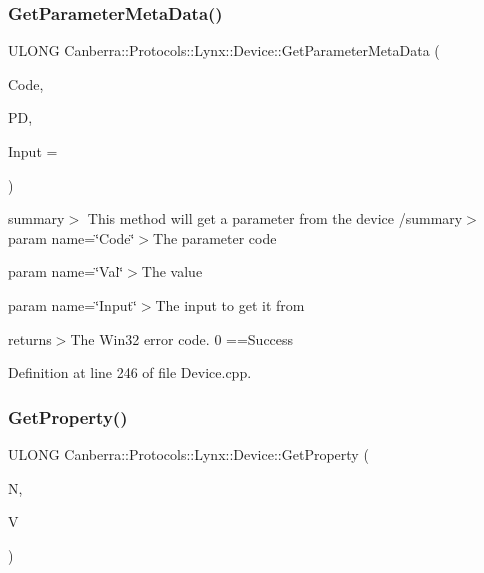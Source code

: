 \subsubsection{\texorpdfstring{Get\+Parameter\+Meta\+Data()}{GetParameterMetaData()}}
{\footnotesize\ttfamily U\+L\+O\+NG Canberra\+::\+Protocols\+::\+Lynx\+::\+Device\+::\+Get\+Parameter\+Meta\+Data (\begin{DoxyParamCaption}\item[{L\+O\+NG}]{Code,  }\item[{\hyperlink{class_canberra_1_1_data_types_1_1_application_1_1_parameter_meta_data}{Canberra\+::\+Data\+Types\+::\+Application\+::\+Parameter\+Meta\+Data} \&}]{PD,  }\item[{U\+S\+H\+O\+RT}]{Input = {} }\end{DoxyParamCaption})}

summary$>$ This method will get a parameter from the device /summary$>$ param name=\char`\"{}\+Code\char`\"{}$>$The parameter code

param name=\char`\"{}\+Val\char`\"{}$>$The value

param name=\char`\"{}\+Input\char`\"{}$>$The input to get it from

returns$>$The Win32 error code. 0 ==Success

Definition at line 246 of file Device.\+cpp.

\mbox{\label{class_canberra_1_1_protocols_1_1_lynx_1_1_device_aaccfa27ad7d6286377093d4ab5b004b4_aaccfa27ad7d6286377093d4ab5b004b4}} 
\subsubsection{\texorpdfstring{Get\+Property()}{GetProperty()}}
{\footnotesize\ttfamily U\+L\+O\+NG Canberra\+::\+Protocols\+::\+Lynx\+::\+Device\+::\+Get\+Property (\begin{DoxyParamCaption}\item[{const \hyperlink{class_canberra_1_1_utility_1_1_core_1_1_string}{Canberra\+::\+Utility\+::\+Core\+::\+String} \&}]{N,  }\item[{\hyperlink{class_canberra_1_1_utility_1_1_core_1_1_variant}{Canberra\+::\+Utility\+::\+Core\+::\+Variant} \&}]{V }\end{DoxyParamCaption})}

